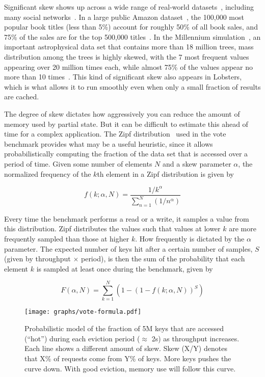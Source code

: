 Significant skew shows up across a wide range of real-world
datasets~\cite{power1,power2,network-skew}, including many social
networks~\cite{network-skew2, community-skew}. In a large public Amazon
dataset~\cite{amazon-skew}, the 100,000 most popular book titles (less than 5\%)
account for roughly 50\% of all book sales, and 75\% of the sales are for the
top 500,000 titles~\cite{zhang2020permutation}. In the Millennium
simulation~\cite{large-skew}, an important astrophysical data set that contains
more than 18 million trees, mass distribution among the trees is highly skewed,
with the 7 most frequent values appearing over 20 million times each, while
almost 75\% of the values appear no more than 10
times~\cite{large-skew-analysis}. This kind of significant skew also appears in
Lobsters, which is what allows it to run smoothly even when only a small
fraction of results are cached.

The degree of skew dictates how aggressively you can reduce the amount of memory
used by partial state. But it can be difficult to estimate this ahead of time
for a complex application. The Zipf distribution~\cite{zipf} used in the vote
benchmark provides what may be a useful heuristic, since it allows
probabilistically computing the fraction of the data set that is accessed over a
period of time. Given some number of elements $N$ and a skew parameter $\alpha$,
the normalized frequency of the $k$th element in a Zipf distribution is given by

\begin{displaymath}
  f(k;\alpha,N)={\frac {1/k^{\alpha}}{\sum \limits _{n=1}^{N}(1/n^{\alpha})}}
\end{displaymath}

Every time the benchmark performs a read or a write, it samples a value from
this distribution. Zipf distributes the values such that values at lower $k$ are
more frequently sampled than those at higher $k$. How frequently is dictated by
the $\alpha$ parameter. The expected number of keys hit after a certain number
of samples, $S$ (given by throughput $\times$ period), is then the sum of the
probability that each element $k$ is sampled at least once during the benchmark,
given by

\begin{displaymath}
  F(\alpha,N)={\sum \limits _{k=1}^{N} \left(1 - \left(1 - f(k; \alpha, N)\right)^{S}\right)}
\end{displaymath}

\begin{figure}[h]
  \centering
  \texttt{[image: graphs/vote-formula.pdf]}
  \caption{Probabilistic model of the fraction of 5M keys that are accessed
  (``hot'') during each eviction period ($\approx$ 2s) as throughput increases.
  Each line shows a different amount of skew. Skew (X/Y) denotes that X\% of
  requests come from Y\% of keys. More keys pushes the curve down. With good
  eviction, memory use will follow this curve.}
  \label{f:vote-formula}
\end{figure}

